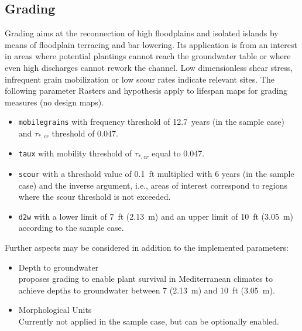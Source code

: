 \subsection{Grading}\label{sec:grading}
Grading aims at the reconnection of high floodplains and isolated islands by means of floodplain terracing and bar lowering. Its application is from an interest in areas where potential plantings cannot reach the groundwater table or where even high discharges cannot rework the channel. Low dimensionless shear stress, infrequent grain mobilization or low scour rates indicate relevant sites. The following parameter Rasters and hypothesis apply to lifespan maps for grading measures (no design maps).
\begin{itemize}
	\item \texttt{mobile{\myUnderscore}grains} with frequency threshold of 12.7~years (in the sample case) and $\tau_{*,cr}$ threshold of 0.047.
	\item \texttt{taux} with mobility threshold of $\tau_{*,cr}$ equal to 0.047.
	\item \texttt{scour} with a threshold value of 0.1~ft multiplied with 6 years (in the sample case) and the inverse argument, i.e., areas of interest correspond to regions where the scour threshold is not exceeded.
	\item \texttt{d2w} with a lower limit of 7~ft (2.13~m) and an upper limit of 10~ft (3.05~m) according to the sample case.
\end{itemize}

Further aspects may be considered in addition to the implemented parameters:
\begin{itemize}
	\item Depth to groundwater\\
	\citet{ycwa16} proposes grading to enable plant survival in Mediterranean climates to achieve depths to groundwater between 7 (2.13~m) and 10~ft (3.05~m).
	\item Morphological Units\\
	Currently not applied in the sample case, but can be optionally enabled.
\end{itemize}

